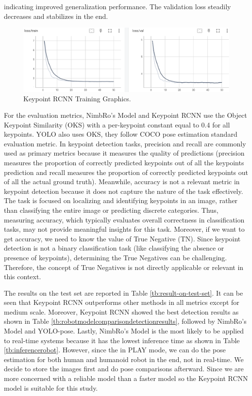   indicating improved generalization performance. The validation loss steadily decreases and stabilizes in the end.
\begin{figure}[ht]
  \centering
  \includegraphics[scale=0.65]{gambar/loss-rcnn.png}
  \caption{Keypoint RCNN Training Graphics.}
  \label{fig:rcnn-training-graphics}
\end{figure}

For the evaluation metrics, NimbRo's Model and Keypoint RCNN use the Object Keypoint Similarity (OKS) with a per-keypoint constant equal to 0.4 for all keypoints.
YOLO also uses OKS, they follow COCO pose estimation standard evaluation metric.
In keypoint detection tasks, precision and recall are commonly used as primary metrics because it measures the quality of predictions (precision measures the proportion of correctly predicted keypoints out of all the keypoints prediction and
  recall measures the proportion of correctly predicted keypoints out of all the actual ground truth). Meanwhile, accuracy is not a relevant metric in keypoint detection because it does not capture the nature of the task effectively.
The task is focused on localizing and identifying keypoints in an image, rather than classifying the entire image or predicting discrete categories. Thus, measuring accuracy, which typically evaluates overall correctness in classification tasks,
  may not provide meaningful insights for this task. Moreover, if we want to get accuracy, we need to know the value of True Negative (TN). Since keypoint detection is not a binary classification task (like classifying the absence or presence of keypoints),
  determining the True Negatives can be challenging. Therefore, the concept of True Negatives is not directly applicable or relevant in this context.

The results on the test set are reported in Table \ref{tb:result-on-test-set}. It can be seen that Keypoint RCNN outperforms other methods in all metrics except for medium scale.
Moreover, Keypoint RCNN showed the best detection results as shown in Table \ref{tb:robotmodelcomparisondetectionresults}, followed by NimbRo's Model and YOLO-pose.
Lastly, NimbRo's Model is the most likely to be applied to real-time systems because it has the lowest inference time as shown in Table \ref{tb:inferencerobot}.
However, since the in PLAY mode, we can do the pose estimation for both human and humanoid robot in the end, not in real-time.
We decide to store the images first and do pose comparisons afterward. Since we are more concerned with a reliable model than a faster model so the Keypoint RCNN model is suitable for this study.

